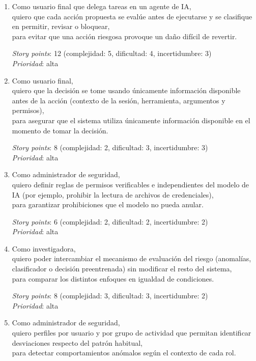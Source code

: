 \documentclass[
11pt, %
]{charter}
\begin{document}
\begin{enumerate}
	\item Como usuario final que delega tareas en un agente de IA, \\
	quiero que cada acción propuesta se evalúe antes de ejecutarse y se clasifique en permitir, revisar o bloquear, \\
	para evitar que una acción riesgosa provoque un daño difícil de revertir.

	\textit{Story points}: 12 (complejidad: 5, dificultad: 4, incertidumbre: 3) \\
	\textit{Prioridad}: alta

	\item Como usuario final, \\
	quiero que la decisión se tome usando únicamente información disponible antes de la acción (contexto de la sesión, herramienta, argumentos y permisos), \\
	para asegurar que el sistema utiliza únicamente información disponible en el momento de tomar la decisión.

	\textit{Story points}: 8 (complejidad: 2, dificultad: 3, incertidumbre: 3) \\
	\textit{Prioridad}: alta

	\item Como administrador de seguridad, \\
	quiero definir reglas de permisos verificables e independientes del modelo de IA (por ejemplo, prohibir la lectura de archivos de credenciales), \\
	para garantizar prohibiciones que el modelo no pueda anular.

	\textit{Story points}: 6 (complejidad: 2, dificultad: 2, incertidumbre: 2) \\
	\textit{Prioridad}: alta

	\item Como investigadora, \\
	quiero poder intercambiar el mecanismo de evaluación del riesgo (anomalías, clasificador o decisión preentrenada) sin modificar el resto del sistema, \\
	para comparar los distintos enfoques en igualdad de condiciones.

	\textit{Story points}: 8 (complejidad: 3, dificultad: 3, incertidumbre: 2) \\
	\textit{Prioridad}: alta

	\item Como administrador de seguridad, \\
	quiero perfiles por usuario y por grupo de actividad que permitan identificar desviaciones respecto del patrón habitual, \\
	para detectar comportamientos anómalos según el contexto de cada rol.


\end{enumerate}
\end{document}
